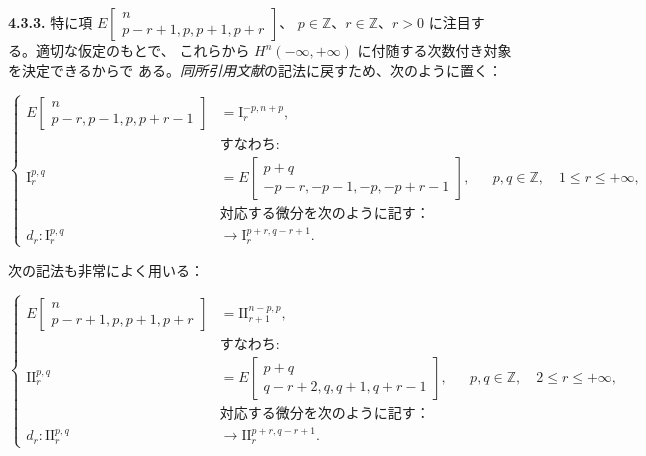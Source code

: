 \clearpage
{}%
\begingroup\small\setlength{\parskip}{0pt}\setlength{\emergencystretch}{1.5em}
\medskip\noindent\textbf{4.3.3.}\quad
特に項
$E\!\left[\begin{smallmatrix}n\\p-r+1,p,p+1,p+r\end{smallmatrix}\right]$、
$p\in\mathbb Z$、$r\in\mathbb Z$、$r>0$ に注目する。適切な仮定のもとで、
これらから $H^n(-\infty,+\infty)$ に付随する次数付き対象を決定できるからで
ある。\emph{同所引用文献}の記法に戻すため、次のように置く：

\[
\left\{
\begin{aligned}
E\!\left[\begin{smallmatrix}n\\p-r,p-1,p,p+r-1\end{smallmatrix}\right]
  &=\mathrm I_r^{-p,n+p},\\
&\textit{すなわち}:\\[-2pt]
\mathrm I_r^{p,q}
  &=E\!\left[\begin{smallmatrix}p+q\\-p-r,-p-1,-p,-p+r-1\end{smallmatrix}\right],
  &&p,q\in\mathbb Z,\quad 1\leq r\leq+\infty,\\
&\text{対応する微分を次のように記す：}\\[-2pt]
d_r\colon\mathrm I_r^{p,q}&\longrightarrow
  \mathrm I_r^{p+r,q-r+1}.
\end{aligned}
\right.
\tag{4.3.3.1}
\]

次の記法も非常によく用いる：

\[
\left\{
\begin{aligned}
E\!\left[\begin{smallmatrix}n\\p-r+1,p,p+1,p+r\end{smallmatrix}\right]
  &=\mathrm{II}_{r+1}^{n-p,p},\\
&\textit{すなわち}:\\[-2pt]
\mathrm{II}_r^{p,q}
  &=E\!\left[\begin{smallmatrix}p+q\\q-r+2,q,q+1,q+r-1\end{smallmatrix}\right],
  &&p,q\in\mathbb Z,\quad 2\leq r\leq+\infty,\\
&\text{対応する微分を次のように記す：}\\[-2pt]
d_r\colon\mathrm{II}_r^{p,q}&\longrightarrow
  \mathrm{II}_r^{p+r,q-r+1}.
\end{aligned}
\right.
\tag{4.3.3.2}
\]

